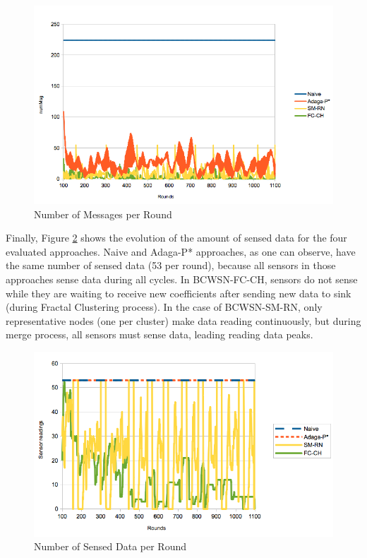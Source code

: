 \documentclass[conference]{IEEEtran}
\begin{document}
\begin{figure}[!htb]
\begin{center}
	\includegraphics[scale=0.35]{WsneeFD_NumMsgPerRound.png}
    \caption{Number of Messages per Round}
    \label{fig:num-msg}
\end{center}
\end{figure}


Finally, Figure \ref{fig:sens-reading} shows the evolution of the amount of
sensed data for the four evaluated approaches.
Naive and Adaga-P* approaches, as one can observe, have the same number of
sensed data (53 per round), because all sensors in those approaches sense data
during all cycles. In BCWSN-FC-CH, sensors do not sense while they are waiting to
receive new coefficients after sending new data to sink (during Fractal
Clustering process). In the case of BCWSN-SM-RN, only representative nodes (one
per cluster) make data reading continuously, but during merge process, all sensors
must sense data, leading reading data peaks.

\begin{figure}[!htb]
\centering
	\includegraphics[scale=0.35]{WsneeFD_SReadPerRound.png}
    \caption{Number of Sensed Data per Round}
    \label{fig:sens-reading}
\end{figure}
\end{document}
